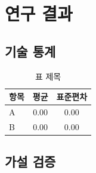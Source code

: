 \chapter{연구 결과}
\label{ch:results}

\section{기술 통계}

\begin{table}[H]
  \centering
  \caption{표 제목}
  \label{tab:example}
  \begin{tabular}{lcc}
    \toprule
    항목 & 평균 & 표준편차 \\
    \midrule
    A & 0.00 & 0.00 \\
    B & 0.00 & 0.00 \\
    \bottomrule
  \end{tabular}
\end{table}


\section{가설 검증}
